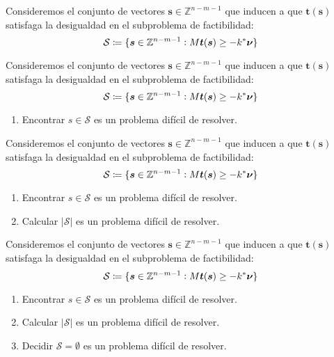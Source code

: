 \documentclass[aspectratio=169,professionalfonts]{beamer}
\newcommand{\Z}{\mathbb{Z}}
\renewcommand{\vec}[1]{\boldsymbol{#1}}
\begin{document}
\begin{frame}
	Consideremos el conjunto de vectores $\vec{s} \in \Z^{n-m-1}$ que inducen a que
	$\vec{t}(\vec{s})$ satisfaga la desigualdad en el subproblema de
	factibilidad:
	\begin{equation*}
		\mathcal{S} \coloneq \lbrace \vec{s} \in \Z^{n-m-1} \vcentcolon M\vec{t}(\vec{s}) \geq -k^*\vec{\nu} \rbrace
	\end{equation*}
\end{frame}


\begin{frame}
	Consideremos el conjunto de vectores $\vec{s} \in \Z^{n-m-1}$ que inducen a que
	$\vec{t}(\vec{s})$ satisfaga la desigualdad en el subproblema de
	factibilidad:
	\begin{equation*}
		\mathcal{S} \coloneq \lbrace \vec{s} \in \Z^{n-m-1} \vcentcolon M\vec{t}(\vec{s}) \geq -k^*\vec{\nu} \rbrace
	\end{equation*}

	\begin{enumerate}
		\item Encontrar $s \in \mathcal{S}$ es un problema difícil de resolver.
	\end{enumerate}
\end{frame}

\begin{frame}
	Consideremos el conjunto de vectores $\vec{s} \in \Z^{n-m-1}$ que inducen a que
	$\vec{t}(\vec{s})$ satisfaga la desigualdad en el subproblema de
	factibilidad:
	\begin{equation*}
		\mathcal{S} \coloneq \lbrace \vec{s} \in \Z^{n-m-1} \vcentcolon M\vec{t}(\vec{s}) \geq -k^*\vec{\nu} \rbrace
	\end{equation*}

	\begin{enumerate}
		\item Encontrar $s \in \mathcal{S}$ es un problema difícil de resolver.
		\item Calcular $|\mathcal{S}|$ es un problema difícil de resolver.
	\end{enumerate}
\end{frame}

\begin{frame}
	Consideremos el conjunto de vectores $\vec{s} \in \Z^{n-m-1}$ que inducen a que
	$\vec{t}(\vec{s})$ satisfaga la desigualdad en el subproblema de
	factibilidad:
	\begin{equation*}
		\mathcal{S} \coloneq \lbrace \vec{s} \in \Z^{n-m-1} \vcentcolon M\vec{t}(\vec{s}) \geq -k^*\vec{\nu} \rbrace
	\end{equation*}

	\begin{enumerate}
		\item Encontrar $s \in \mathcal{S}$ es un problema difícil de resolver.
		\item Calcular $|\mathcal{S}|$ es un problema difícil de resolver.
		\item Decidir $\mathcal{S} = \emptyset$ es un problema difícil de resolver.
	\end{enumerate}
\end{frame}
\end{document}
